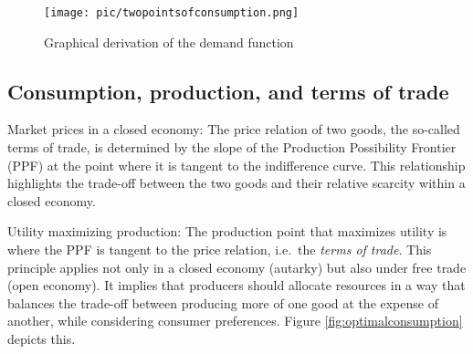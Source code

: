 \begin{figure}
	\centering
	\texttt{[image: pic/twopointsofconsumption.png]}
	\caption{\label{fig:tpoc} Graphical derivation of the demand function}
\end{figure}

%

\subsection{Consumption, production, and terms of trade}\label{consumption-production-and-terms-of-trade}

Market prices in a closed economy:
The price relation of two goods, the so-called terms of trade, is determined by the slope of the Production Possibility Frontier (PPF) at the point where it is tangent to the indifference curve. This relationship highlights the trade-off between the two goods and their relative scarcity within a closed economy.

Utility maximizing production:
The production point that maximizes utility is where the PPF is tangent to the price relation, i.e.~the \emph{terms of trade}. This principle applies not only in a closed economy (autarky) but also under free trade (open economy). It implies that producers should allocate resources in a way that balances the trade-off between producing more of one good at the expense of another, while considering consumer preferences. Figure \ref{fig:optimalconsumption} depicts this.




